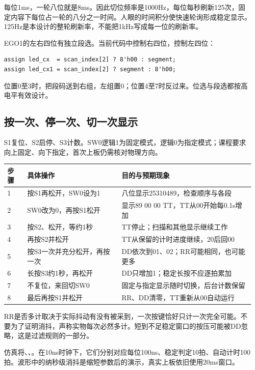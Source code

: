 每位1ms，一轮八位就是8ms。因此切位频率是1000Hz，每位每秒刷新125次，固定内容下每位占一轮的八分之一时间。人眼的时间积分使快速轮询形成稳定显示。125Hz是本设计的整轮刷新率，不能把1kHz写成每一位的刷新率。

EGO1的左右四位有独立段选。当前代码中控制右四位，控制左四位：
\begin{lstlisting}
assign led_cx  = scan_index[2] ? 8'h00 : segment;
assign led_cx1 = scan_index[2] ? segment : 8'h00;
\end{lstlisting}
位置0至3时，把段码送到右组，左组置0；位置4至7时反过来。位选与段选都按高电平有效设计。

\subsection{按一次、停一次、切一次显示}
S1复位、S2启停、S3计数。SW0逻辑1为固定模式，逻辑0为指定模式；课程要求向上固定、向下指定，首次上板仍需核对物理方向。
\begin{center}
\begin{tabularx}{\linewidth}{@{}lXX@{}}\toprule
步骤 & 具体操作 & 目的与预期现象\\\midrule
1 & 按S1再松开，SW0设为1 & 八位显示25310489，检查顺序与各段\\
2 & SW0改为0，再按S1松开 & 显示89 00 00 TT，TT从00开始每0.1s增加\\
3 & 按S2、松开，等约1秒 & TT停止；扫描和其他显示继续工作\\
4 & 再按S2并松开 & TT从保留的计时进度继续，20后回00\\
5 & 按S3一次并充分松开，再按一次 & DD依次到01、02；RR可能相同，也可能更多\\
6 & 长按S3约1秒，再松开 & DD只增加1；稳定长按不应逐拍累加\\
7 & 不复位，来回切SW0 & 固定与指定显示随时切换，后台计数保留\\
8 & 最后再按S1并松开 & RR、DD清零，TT重新从00自动运行\\\bottomrule
\end{tabularx}
\end{center}

RR是否多计取决于实际抖动有没有被采到，一次按键恰好只计一次完全可能。不要为了证明消抖，声称实物每次必然多计。短到不足稳定窗口的按压可能被DD忽略，这是过滤规则的一部分。

仿真将、、。在10ns时钟下，它们分别对应每位100ns、稳定判定10拍、自动计时100拍。波形中的纳秒级消抖是缩短参数后的演示，真实上板依旧使用20ms窗口。

